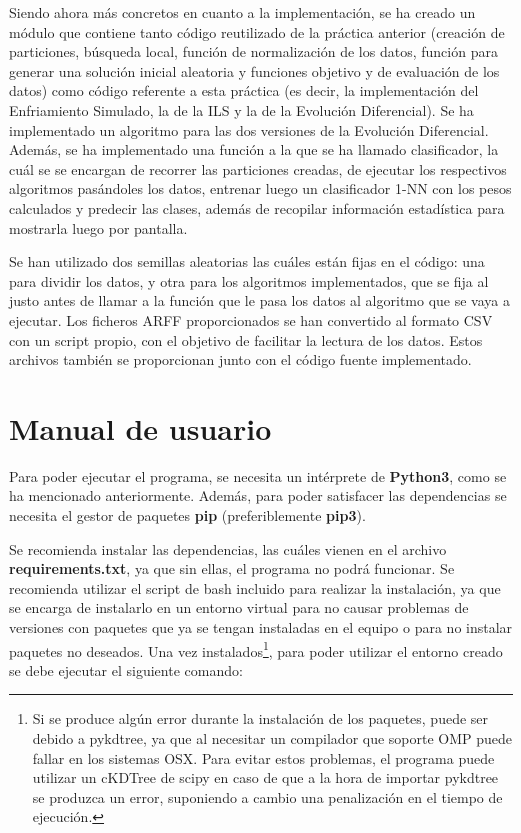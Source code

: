 \documentclass[11pt,a4paper]{article}
\begin{document}
Siendo ahora más concretos en cuanto a la implementación, se ha creado un módulo que contiene tanto código reutilizado de la
práctica anterior (creación de particiones, búsqueda local, función de normalización de los datos, función para generar una
solución inicial aleatoria y funciones objetivo y de evaluación de los datos) como código referente a esta práctica (es decir,
la implementación del Enfriamiento Simulado, la de la ILS y la de la Evolución Diferencial). Se ha implementado un algoritmo
para las dos versiones de la Evolución Diferencial. Además, se ha implementado una función a la que se ha llamado clasificador,
la cuál se se encargan de recorrer las particiones creadas, de ejecutar los respectivos algoritmos pasándoles los datos, entrenar
luego un clasificador 1-NN con los pesos calculados y predecir las clases, además de recopilar información estadística para
mostrarla luego por pantalla. 

Se han utilizado dos semillas aleatorias las cuáles están fijas en el código: una para dividir los datos, y otra para los
algoritmos implementados, que se fija al justo antes de llamar a la función que le pasa los datos al algoritmo que se vaya a
ejecutar. Los ficheros ARFF proporcionados se han convertido al formato CSV con un script propio, con el objetivo de facilitar
la lectura de los datos. Estos archivos también se proporcionan junto con el código fuente implementado.

\newpage

\section{Manual de usuario}

Para poder ejecutar el programa, se necesita un intérprete de \textbf{Python3}, como se ha mencionado anteriormente. Además,
para poder satisfacer las dependencias se necesita el gestor de paquetes \textbf{pip} (preferiblemente \textbf{pip3}).

Se recomienda instalar las dependencias, las cuáles vienen en el archivo \textbf{requirements.txt}, ya que sin ellas, el
programa no podrá funcionar. Se recomienda utilizar el script de bash incluido para realizar la instalación, ya que se
encarga de instalarlo en un entorno virtual para no causar problemas de versiones con paquetes que ya se tengan instaladas en
el equipo o para no instalar paquetes no deseados. Una vez instalados\footnote{Si se produce algún error durante la
instalación de los paquetes, puede ser debido a pykdtree, ya que al necesitar un compilador que soporte OMP puede fallar en
los sistemas OSX. Para evitar estos problemas, el programa puede utilizar un cKDTree de scipy en caso de que a la hora de
importar pykdtree se produzca un error, suponiendo a cambio una penalización en el tiempo de ejecución.}, para poder utilizar
el entorno creado se debe ejecutar el siguiente comando:
\end{document}
